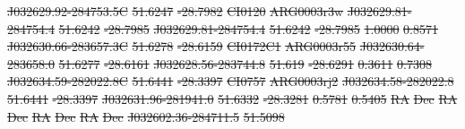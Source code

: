 \documentclass[11pt, a4paper]{book}
\providecommand{\DIFdeltex}[1]{{\protect\color{red}\sout{#1}}}                      %
\providecommand{\DIFdel}[1]{\texorpdfstring{\DIFdeltex{#1}}{}} %
\begin{document}
\DIFdel{J032629.92-284753.5C }%
\DIFdel{51.6247 }%
\DIFdel{-28.7982 }%
\DIFdel{CI0120 }%
\DIFdel{ARG0003r3w }%
\DIFdel{J032629.81-284754.4 }%
\DIFdel{51.6242 }%
\DIFdel{-28.7985 }%
\DIFdel{J032629.81-284754.4 }%
\DIFdel{51.6242 }%
\DIFdel{-28.7985 }%
\DIFdel{1.0000 }%
\DIFdel{0.8571 }%
\DIFdel{J032630.66-283657.3C }%
\DIFdel{51.6278 }%
\DIFdel{-28.6159 }%
\DIFdel{CI0172C1 }%
\DIFdel{ARG0003r55 }%
\DIFdel{J032630.64-283658.0 }%
\DIFdel{51.6277 }%
\DIFdel{-28.6161 }%
\DIFdel{J032628.56-283744.8 }%
\DIFdel{51.619 }%
\DIFdel{-28.6291 }%
\DIFdel{0.3611 }%
\DIFdel{0.7308 }%
\DIFdel{J032634.59-282022.8C }%
\DIFdel{51.6441 }%
\DIFdel{-28.3397 }%
\DIFdel{CI0757 }%
\DIFdel{ARG0003rj2 }%
\DIFdel{J032634.58-282022.8 }%
\DIFdel{51.6441 }%
\DIFdel{-28.3397 }%
\DIFdel{J032631.96-281941.0 }%
\DIFdel{51.6332 }%
\DIFdel{-28.3281 }%
\DIFdel{0.5781 }%
\DIFdel{0.5405 }%
\DIFdel{RA }%
\DIFdel{Dec }%
\DIFdel{RA }%
\DIFdel{Dec }%
\DIFdel{RA }%
\DIFdel{Dec }%
\DIFdel{RA }%
\DIFdel{Dec}%
\DIFdel{J032602.36-284711.5 }%
\DIFdel{51.5098 }%
\end{document}
